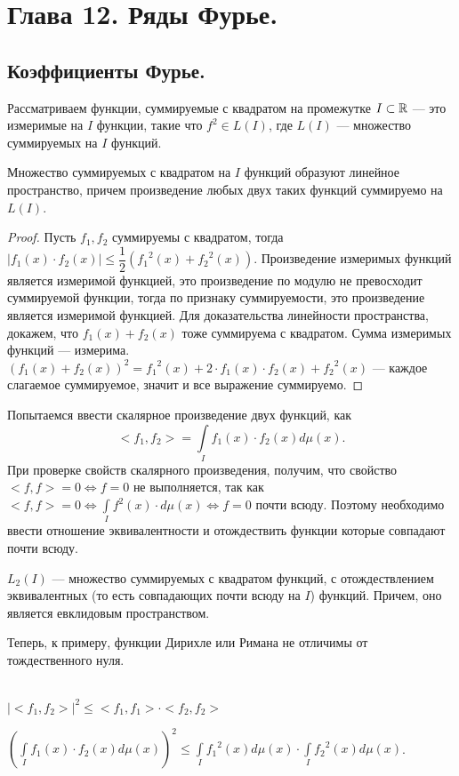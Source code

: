 \setcounter{section}{11}
\section{Глава 12. Ряды Фурье.}
\subsection{Коэффициенты Фурье.}
Рассматриваем функции, суммируемые с квадратом на промежутке $I\subset \mathbb{R}$ --- это измеримые на $I$ функции, такие что $f^2\in L(I)$, где $L(I)$ --- множество суммируемых на $I$ функций.

\begin{prop}
	Множество суммируемых с квадратом на $I$ функций образуют линейное пространство, причем произведение любых двух таких функций суммируемо на $L(I)$.
\end{prop}

\begin{proof}
	Пусть $f_1, f_2$ суммируемы с квадратом, тогда $|f_1(x)\cdot f_2(x)|\leqslant\dfrac{1}{2} \left({f_1}^2(x)+{f_2}^2(x)\right)$. Произведение измеримых функций является измеримой функцией, это произведение по модулю не превосходит суммируемой функции, тогда по признаку суммируемости, это произведение является измеримой функцией. Для доказательства линейности пространства, докажем, что $f_1(x)+f_2(x)$ тоже суммируема с квадратом. Сумма измеримых функций --- измерима. $(f_1(x)+f_2(x))^2={f_1}^2(x)+2\cdot f_1(x)\cdot f_2(x) + {f_2}^2(x)$ --- каждое слагаемое суммируемое, значит и все выражение суммируемо.
\end{proof}

Попытаемся ввести скалярное произведение двух функций, как $$<f_1, f_2>=\int\limits_{I}f_1(x)\cdot f_2(x)d\mu(x).$$ При проверке свойств скалярного произведения, получим, что свойство $<f,f>=0\Leftrightarrow f=0$ не выполняется, так как $<f,f>=0\Leftrightarrow \int\limits_{I}f^2(x)\cdot d\mu(x)\Leftrightarrow f=0$ почти всюду. Поэтому необходимо ввести отношение эквивалентности и отождествить функции которые совпадают почти всюду.

\begin{Def}
	$L_2(I)$ --- множество суммируемых с квадратом функций, с отождествлением эквивалентных (то есть совпадающих почти всюду на $I$) функций. Причем, оно является евклидовым пространством.
\end{Def}

Теперь, к примеру, функции Дирихле или Римана не отличимы от тождественного нуля.
\begin{prop}\ \\
	$|<f_1,f_2>|^2\leqslant <f_1,f_1>\cdot<f_2,f_2>$
	
	$\left(\int\limits_{I}f_1(x)\cdot f_2(x)d\mu(x)\right)^2\leqslant\int\limits_{I}{f_1}^2(x)d\mu(x)\cdot \int\limits_{I}{f_2}^2(x)d\mu(x)$.
\end{prop}

